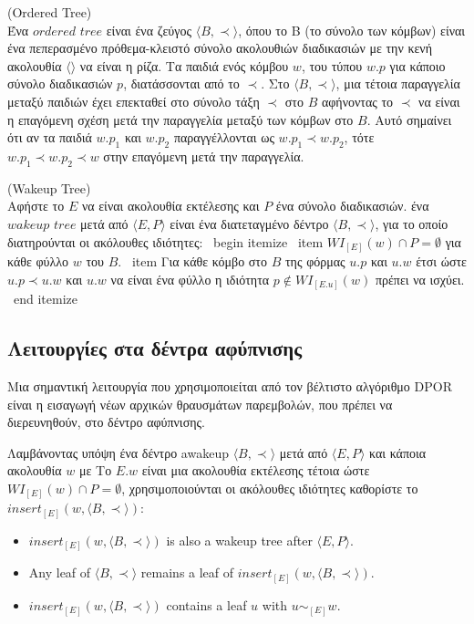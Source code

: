\begin{definition}{(Ordered Tree)}\label{def:Ordered}\\
Ένα $ordered$ $tree$ είναι ένα ζεύγος $\langle B , \prec \rangle$, όπου το B (το σύνολο των κόμβων) είναι ένα πεπερασμένο πρόθεμα-κλειστό
σύνολο ακολουθιών διαδικασιών με την κενή ακολουθία $\langle\rangle$ να είναι η ρίζα.
Τα παιδιά ενός κόμβου $w$, του τύπου $w.p$ για κάποιο σύνολο διαδικασιών $p$, διατάσσονται από το $\prec$.
Στο $\langle B , \prec \rangle$, μια τέτοια παραγγελία μεταξύ παιδιών έχει επεκταθεί στο σύνολο
τάξη $\prec$ στο $B$ αφήνοντας το $\prec$ να είναι η επαγόμενη σχέση μετά την παραγγελία μεταξύ των κόμβων στο $B$.
Αυτό σημαίνει ότι αν τα παιδιά $w.p_1$ και $w.p_2$ παραγγέλλονται ως $w.p_1 \prec w.p_2$,
τότε $w.p_1 \prec w.p_2 \prec w $ στην επαγόμενη μετά την παραγγελία.
\end{definition}

\begin{definition}{(Wakeup Tree)}\\
Αφήστε το $E$ να είναι ακολουθία εκτέλεσης και $P$ ένα σύνολο διαδικασιών. ένα $wakeup$ $tree$ μετά από $\langle E , P \rangle$
είναι ένα διατεταγμένο δέντρο $\langle B , \prec \rangle$, για το οποίο διατηρούνται οι ακόλουθες ιδιότητες:
\ begin {itemize}
\ item $WI_{[E]}(w) \cap P = \emptyset$ για κάθε φύλλο $w$ του $B$.
\ item Για κάθε κόμβο στο $B$ της φόρμας $u.p$ και $u.w$ έτσι ώστε $u.p \prec u.w$ και $u.w$ να είναι ένα φύλλο
η ιδιότητα $p \not \in WI_{[E.u]}(w)$ πρέπει να ισχύει.
\ end {itemize}
\end{definition}

\subsection{Λειτουργίες στα δέντρα αφύπνισης}



Μια σημαντική λειτουργία που χρησιμοποιείται από τον βέλτιστο αλγόριθμο DPOR είναι η εισαγωγή νέων αρχικών θραυσμάτων παρεμβολών,
που πρέπει να διερευνηθούν, στο δέντρο αφύπνισης.

Λαμβάνοντας υπόψη ένα δέντρο awakeup $\langle B , \prec \rangle$ μετά από $\langle E , P \rangle$ και κάποια ακολουθία $w$ με
Το $E.w$ είναι μια ακολουθία εκτέλεσης τέτοια ώστε $WI_{[E]}(w) \cap P = \emptyset$, χρησιμοποιούνται οι ακόλουθες ιδιότητες
καθορίστε το $insert_{[E]}(w,\langle B , \prec \rangle)$:

\begin{itemize}
    \item $insert_{[E]}(w,\langle B , \prec \rangle)$ is also a wakeup tree after $\langle E , P \rangle$.
    \item Any leaf of $\langle B , \prec \rangle$ remains a leaf of $insert_{[E]}(w,\langle B , \prec \rangle)$.
    \item $insert_{[E]}(w,\langle B , \prec \rangle)$ contains a  leaf $u$ with $u \sim_{[E]} w$.
\end{itemize}


